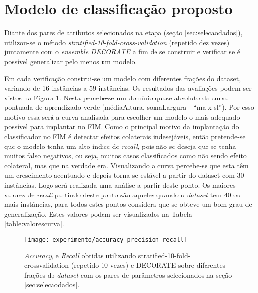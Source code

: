 \section{Modelo de classificação proposto}
\label{sec:constvalidacao}
Diante dos pares de atributos selecionados na etapa (seção \ref{sec:selecaodados}), utilizou-se o método \textit{stratified-10-fold-cross-validation} (repetido dez vezes) juntamente com o \textit{ensemble DECORATE} a fim de se construir e verificar se é possível generalizar pelo menos um modelo. 

Em cada verificação construi-se um modelo com diferentes frações do dataset, variando de 16 instâncias a 59 instâncias. Os resultados das avaliações podem ser vistos na Figura \ref{fig:accuracy_precision_recall}. Nesta percebe-se um domínio quase absoluto da curva pontuada de aprendizado verde (médiaAltura, somaLargura - ``ma x sl''). Por esso motivo essa será a curva analisada para escolher um modelo o mais adequado possível para implantar no FIM. Como o principal motivo da implantação do classificador no FIM é detectar efeitos colaterais indesejáveis, então pretende-se que o modelo tenha um alto índice de \textit{recall}, pois não se deseja que se tenha muitos falso negativos, ou seja, muitos casos classificados como não sendo efeito colateral, mas que na verdade era. Visualizando a curva percebe-se que esta têm um crescimento acentuado e depois torna-se estável a partir do dataset com 30 instâncias. Logo será realizada uma análise a partir deste ponto. Os maiores valores de \textit{recall} partindo deste ponto são aqueles quando o \textit{dataset} tem 40 ou mais instâncias, para todos estes pontos considera que se obteve um bom grau de generalização. Estes valores podem ser visualizados na Tabela \ref{table:valorescurva}. 

\begin{figure}[!htb] \centering 
  \centering
  \texttt{[image: experimento/accuracy\_precision\_recall]} 
  \caption{\textit{Accuracy},  e \textit{Recall} obtidas utilizando stratified-10-fold-crossvalidation (repetido 10 vezes) e DECORATE sobre diferentes frações do \textit{dataset} com os pares de parâmetros  selecionados na seção \ref{sec:selecaodados}.} 
  \label{fig:accuracy_precision_recall}
\end{figure}

